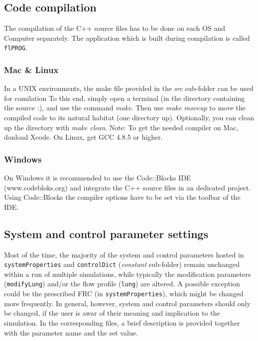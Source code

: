 \subsection{Code compilation} \label{ssec:code_compilation}
The compilation of the C++ source files has to be done on each OS and Computer separately.
The application which is built during compilation is called \texttt{flPROG}.

\subsubsection{Mac \& Linux}
In a UNIX environments, the make file provided in the \textit{src} sub-folder can be used for comilation
To this end, simply open a terminal (in the directory containing the source :), and use the command \textit{make}.
Then use \textit{make moveup} to move the compiled code to its natural habitat (one directory up).
Optionally, you can clean up the directory with \textit{make clean}.
Note: To get the needed compiler on Mac, donload Xcode. On Linux, get GCC 4.8.5 or higher.

\subsubsection{Windows}
On Windows it is recommended to use the Code::Blocks IDE (www.codebloks.org) and integrate the C++ source files in an dedicated project.
Using Code::Blocks the compiler options have to be set via the toolbar of the IDE.


\subsection{System and control parameter settings} \label{ssec:parameter_settingss}
Most of the time, the majority of the system and control parameters hosted in \texttt{systemProperties} and \texttt{controlDict} (\textit{constant} sub-folder) remain unchanged within a run of multiple simulations, while typically the modification parameters (\texttt{modifyLung}) and/or the flow profile (\texttt{lung}) are altered.
A possible exception could be the prescribed FRC (in \texttt{systemProperties}), which might be changed more frequently.
In general, however, system and control parameters should only be changed, if the user is awar of their meaning and implication to the simulation.
In the corresponding files, a brief description is provided together with the parameter name and the set value.


